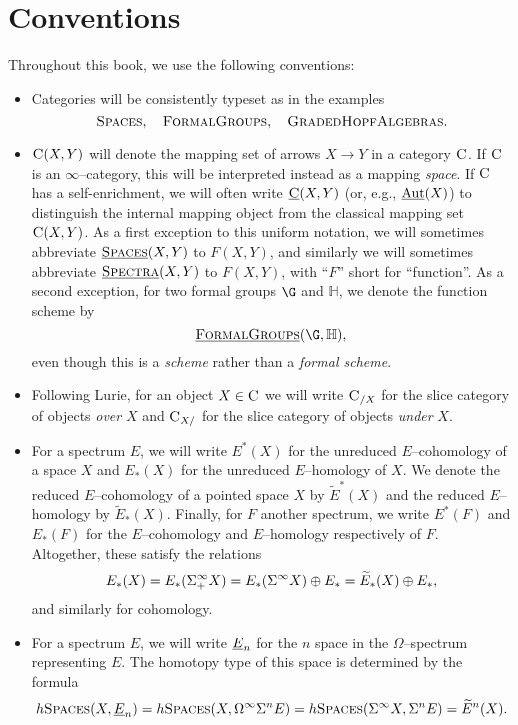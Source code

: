 
\section{Conventions}

Throughout this book, we use the following conventions:

\begin{itemize}
\item Categories will be consistently typeset as in the examples \[\normalfont\textsc{Spaces}, \quad \normalfont\textsc{FormalGroups}, \quad \normalfont\textsc{GradedHopfAlgebras}.\]
\item $\normalfont\textsc{C}(X, Y)$ will denote the mapping set of arrows $X \to Y$ in a category $\normalfont\textsc{C}$.  If $\normalfont\textsc{C}$ is an $\infty$--category, this will be interpreted instead as a mapping \emph{space}.  If $\normalfont\textsc{C}$ has a self-enrichment, we will often write $\underline{\normalfont\textsc{C}}(X, Y)$ (or, e.g., $\operatorname{\underline{\smash{\operatorname{Aut}}}}(X)$) to distinguish the internal mapping object from the classical mapping set $\normalfont\textsc{C}(X, Y)$.  As a first exception to this uniform notation, we will sometimes abbreviate $\underline{\normalfont\textsc{Spaces}}(X, Y)$ to $F(X, Y)$, and similarly we will sometimes abbreviate $\underline{\normalfont\textsc{Spectra}}(X, Y)$ to $F(X, Y)$, with ``$F$'' short for ``function''.  As a second exception, for two formal groups $\G$ and $\mathbb H$, we denote the function scheme by \[\InternalHom{FormalGroups}(\G, \mathbb H),\] even though this is a \emph{scheme} rather than a \emph{formal scheme}.
\item Following Lurie, for an object $X \in \normalfont\textsc{C}$ we will write $\normalfont\textsc{C}_{/X}$ for the slice category of objects \emph{over} $X$ and $\normalfont\textsc{C}_{X/}$ for the slice category of objects \emph{under} $X$.
\item For a spectrum $E$, we will write $E^*(X)$ for the unreduced $E$--cohomology of a space $X$ and $E_*(X)$ for the unreduced $E$--homology of $X$.  We denote the reduced $E$--cohomology of a pointed space $X$ by $\widetilde E^*(X)$ and the reduced $E$--homology by $\widetilde E_*(X)$.  Finally, for $F$ another spectrum, we write $E^*(F)$ and $E_*(F)$ for the $E$--cohomology and $E$--homology respectively of $F$.  Altogether, these satisfy the relations \[E_*(X) = E_*(\Sigma^\infty_+ X) = E_*(\Sigma^\infty X) \oplus E_* = \widetilde E_*(X) \oplus E_*,\] and similarly for cohomology.
\item For a spectrum $E$, we will write $\underline{\smash{E}}_{n}$ for the $n${\th} space in the $\Omega$--spectrum representing $E$.  The homotopy type of this space is determined by the formula \[h\normalfont\textsc{Spaces}(X, \underline{\smash{E}}_{n}) = h\normalfont\textsc{Spaces}(X, \Omega^\infty \Sigma^n E) = h\normalfont\textsc{Spaces}(\Sigma^\infty X, \Sigma^n E) = \widetilde E^n(X).\]

\end{itemize}
